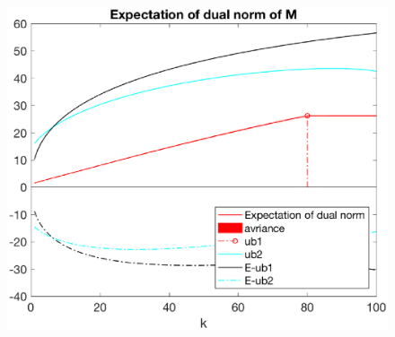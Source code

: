 \documentclass[12pt]{article}
\begin{document}
\begin{figure}[h]
    \begin{minipage}[c]{.4\linewidth}
        \centering
        \includegraphics[width=\linewidth]{Fig/dualnorm-u0ones-k0-80-minusnoise.eps}
    \end{minipage}
\end{figure}

\end{document}
